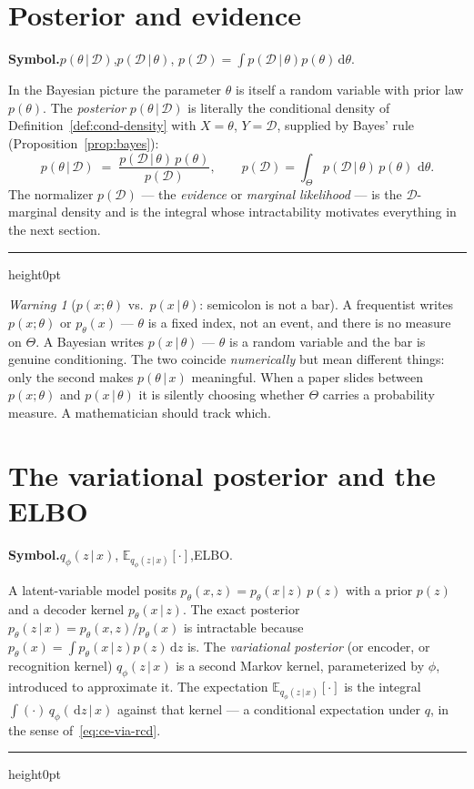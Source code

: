 \documentclass[11pt,oneside]{report}
\theoremstyle{plain}
\theoremstyle{definition}
\theoremstyle{remark}
\newtheorem{warning}[theorem]{Warning}
\newenvironment{mlentry}[1]%
  {\par\medskip\noindent\textbf{Symbol.}\quad #1\par\nobreak\smallskip}%
  {\par\medskip\hrule height0pt\medskip}
\newcommand{\E}{\mathbb{E}}
\newcommand{\dd}{\,\mathrm{d}}
\newcommand{\Dcal}{\mathcal{D}}
\newcommand{\given}{\,\vert\,}
\numberwithin{equation}{chapter}
\begin{document}
\section{Posterior and evidence}\label{sec:posterior}

\begin{mlentry}{$p(\theta\given\Dcal)$,\quad $p(\Dcal\given\theta)$,\quad
$p(\Dcal)=\int p(\Dcal\given\theta)p(\theta)\dd\theta$.}
In the Bayesian picture the parameter $\theta$ is itself a random variable
with prior law $p(\theta)$. The \emph{posterior} $p(\theta\given\Dcal)$ is
literally the conditional density of Definition~\ref{def:cond-density} with
$X=\theta$, $Y=\Dcal$, supplied by Bayes' rule
(Proposition~\ref{prop:bayes}):
\begin{equation}\label{eq:posterior}
  p(\theta\given\Dcal)\;=\;\frac{p(\Dcal\given\theta)\,p(\theta)}{p(\Dcal)},
  \qquad p(\Dcal)=\int_\Theta p(\Dcal\given\theta)\,p(\theta)\,\dd\theta.
\end{equation}
The normalizer $p(\Dcal)$ --- the \emph{evidence} or \emph{marginal
likelihood} --- is the $\Dcal$-marginal density and is the integral whose
intractability motivates everything in the next section.
\end{mlentry}

\begin{warning}[$p(x;\theta)$ vs.\ $p(x\given\theta)$: semicolon is not a bar]
A frequentist writes $p(x;\theta)$ or $p_\theta(x)$ --- $\theta$ is a fixed
index, not an event, and there is no measure on $\Theta$. A Bayesian writes
$p(x\given\theta)$ --- $\theta$ is a random variable and the bar is genuine
conditioning. The two coincide \emph{numerically} but mean different things:
only the second makes $p(\theta\given x)$ meaningful. When a paper slides
between $p(x;\theta)$ and $p(x\given\theta)$ it is silently choosing whether
$\Theta$ carries a probability measure. A mathematician should track which.
\end{warning}

\section{The variational posterior and the ELBO}\label{sec:elbo}

\begin{mlentry}{$q_\phi(z\given x)$,\quad
$\E_{q_\phi(z\given x)}[\cdot]$,\quad ELBO.}
A latent-variable model posits $p_\theta(x,z)=p_\theta(x\given z)\,p(z)$
with a prior $p(z)$ and a decoder kernel $p_\theta(x\given z)$. The exact
posterior $p_\theta(z\given x)=p_\theta(x,z)/p_\theta(x)$ is intractable
because $p_\theta(x)=\int p_\theta(x\given z)p(z)\dd z$ is. The
\emph{variational posterior} (or encoder, or recognition kernel)
$q_\phi(z\given x)$ is a second Markov kernel, parameterized by $\phi$,
introduced to approximate it. The expectation $\E_{q_\phi(z\given x)}[\cdot]$
is the integral $\int(\cdot)\,q_\phi(\dd z\given x)$ against that kernel ---
a conditional expectation under $q$, in the sense of~\eqref{eq:ce-via-rcd}.
\end{mlentry}
\end{document}
